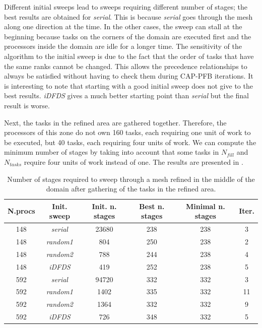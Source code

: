 \documentclass{mc2015}
\renewcommand{\(}{\left(}
\renewcommand{\)}{\right)}
\renewcommand{\[}{\left[}
\renewcommand{\]}{\right]}
\begin{document}
Different initial sweeps lead to sweeps requiring different number of
stages; the best results are obtained for \emph{serial}. This is because
\emph{serial} goes through the mesh along one direction at the time. In the
other cases, the sweep can stall at the beginning because tasks on the corners
of the domain are executed first and the processors inside the domain are idle for a longer
time. The sensitivity of the algorithm to the initial sweep is due to the fact
that the order of tasks that have the same ranks cannot be changed. This allows
the precedence relationships to always be satisfied without
having to check them during CAP-PFB iterations. It is interesting to note that
starting with a good initial sweep does not give to the best results.
\emph{iDFDS} gives a much better starting point than \emph{serial} but the final
result is worse.

Next, the tasks in the refined area are gathered together. Therefore, the
processors of this zone do not own 160 tasks, each requiring one unit of work to
be executed, but 40 tasks, each requiring four units of work. We
can compute the minimum number of stages by taking into account that some tasks
in $N_{fill}$ and $N_{tasks}$ require four units of work instead of one. The
results are presented in .

\begin{table}[H]
  \begin{center}
    \caption{Number of stages required to sweep through a mesh refined in the
      middle of the domain after gathering of the tasks in the refined area.}
    \begin{tabular}{|c|c|c|c|c|c|}
      \hline
      N.procs & Init. sweep & Init. n. stages & Best n. stages & Minimal n. stages & Iter. \\
      \hline
      148 &  \emph{serial} & 23680 & 238 & 238 &  3 \\
      148 & \emph{random1} &   804 & 250 & 238 &  2 \\
      148 & \emph{random2} &   788 & 244 & 238 &  4 \\
      148 &   \emph{iDFDS} &   419 & 252 & 238 &  5 \\
      592 &  \emph{serial} & 94720 & 332 & 332 &  3 \\
      592 & \emph{random1} &  1402 & 335 & 332 & 11 \\
      592 & \emph{random2} &  1364 & 332 & 332 &  9 \\
      592 &   \emph{iDFDS} &   726 & 348 & 332 &  5 \\
      \hline
    \end{tabular}
    \label{amr_2}
  \end{center}
\end{table}
\end{document}
